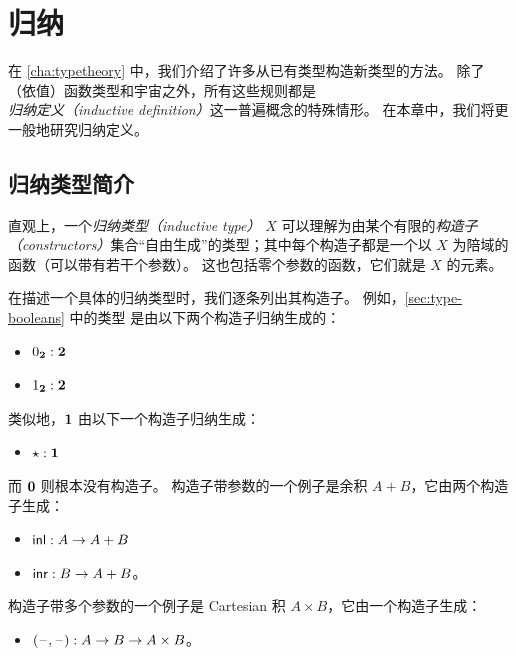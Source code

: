 \chapter{归纳}
\label{cha:induction}

在 \cref{cha:typetheory} 中，我们介绍了许多从已有类型构造新类型的方法。
除了（依值）函数类型和宇宙之外，所有这些规则都是\emph{归纳定义（inductive definition）}这一普遍概念的特殊情形。
在本章中，我们将更一般地研究归纳定义。

\section{归纳类型简介}
\label{sec:bool-nat}

%
直观上，一个\emph{归纳类型（inductive type）} $X$ 可以理解为由某个有限的\emph{构造子（constructors）}集合“自由生成”的类型；其中每个构造子都是一个以 $X$ 为陪域的函数（可以带有若干个参数）。
这也包括零个参数的函数，它们就是 $X$ 的元素。

在描述一个具体的归纳类型时，我们逐条列出其构造子。
例如，\cref{sec:type-booleans} 中的类型 \bool 是由以下两个构造子归纳生成的：

\begin{itemize}
\item ${0_{\mathbf{2}}}:\mathbf{2}$
\item ${1_{\mathbf{2}}}:\mathbf{2}$
\end{itemize}

类似地，$\mathbf{1}$ 由以下一个构造子归纳生成：

\begin{itemize}
\item $\star:\mathbf{1}$
\end{itemize}

而 $\mathbf{0}$ 则根本没有构造子。
构造子带参数的一个例子是余积 $A+B$，它由两个构造子生成：

\begin{itemize}
\item ${\mathsf{inl}}:A\to A+B$
\item ${\mathsf{inr}}:B\to A+B$。
\end{itemize}

构造子带多个参数的一个例子是 Cartesian 积 $A\times B$，它由一个构造子生成：

\begin{itemize}
\item ${\mathopen{}(\mathord{\hspace{1pt}\text{--}\hspace{1pt}}, \mathord{\hspace{1pt}\text{--}\hspace{1pt}})\mathclose{}} : A\to B \to A\times B$。
\end{itemize}


